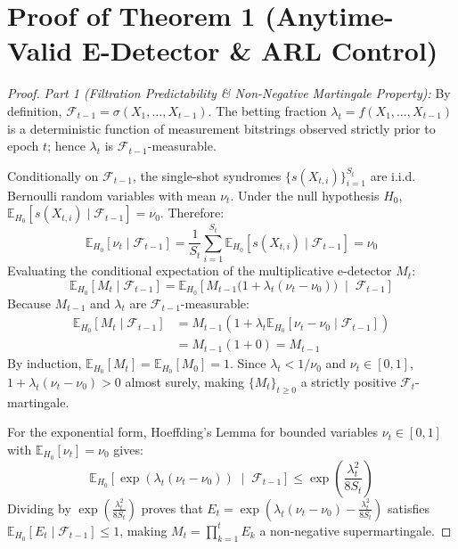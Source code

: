 \documentclass[aps,pra,twocolumn,superscriptaddress,10pt,floatfix]{revtex4-2}
\begin{document}
\section{Proof of Theorem 1 (Anytime-Valid E-Detector \& ARL Control)}
\label{app:proof_thm1}
\begin{proof}
\textit{Part 1 (Filtration Predictability \& Non-Negative Martingale Property):}
By definition, $\mathcal{F}_{t-1} = \sigma(X_1, \dots, X_{t-1})$. The betting fraction $\lambda_t = f(X_1, \dots, X_{t-1})$ is a deterministic function of measurement bitstrings observed strictly prior to epoch $t$; hence $\lambda_t$ is $\mathcal{F}_{t-1}$-measurable.

Conditionally on $\mathcal{F}_{t-1}$, the single-shot syndromes $\{s(X_{t, i})\}_{i=1}^{S_t}$ are i.i.d. Bernoulli random variables with mean $\nu_t$. Under the null hypothesis $H_0$, $\mathbb{E}_{H_0}[s(X_{t, i}) \mid \mathcal{F}_{t-1}] = \nu_0$. Therefore:
\begin{equation}
\mathbb{E}_{H_0}[\nu_t \mid \mathcal{F}_{t-1}] = \frac{1}{S_t} \sum_{i=1}^{S_t} \mathbb{E}_{H_0}[s(X_{t, i}) \mid \mathcal{F}_{t-1}] = \nu_0
\end{equation}
Evaluating the conditional expectation of the multiplicative e-detector $M_t$:
\begin{equation}
\mathbb{E}_{H_0}[M_t \mid \mathcal{F}_{t-1}] = \mathbb{E}_{H_0}\left[ M_{t-1} \big(1 + \lambda_t(\nu_t - \nu_0)\big) \;\middle|\; \mathcal{F}_{t-1} \right]
\end{equation}
Because $M_{t-1}$ and $\lambda_t$ are $\mathcal{F}_{t-1}$-measurable:
\begin{align}
\mathbb{E}_{H_0}[M_t \mid \mathcal{F}_{t-1}] &= M_{t-1} \left( 1 + \lambda_t \mathbb{E}_{H_0}[\nu_t - \nu_0 \mid \mathcal{F}_{t-1}] \right) \nonumber \\
&= M_{t-1} (1 + 0) = M_{t-1}
\end{align}
By induction, $\mathbb{E}_{H_0}[M_t] = \mathbb{E}_{H_0}[M_0] = 1$. Since $\lambda_t < 1/\nu_0$ and $\nu_t \in [0, 1]$, $1 + \lambda_t(\nu_t - \nu_0) > 0$ almost surely, making $\{M_t\}_{t \ge 0}$ a strictly positive $\mathcal{F}_t$-martingale.

For the exponential form, Hoeffding's Lemma for bounded variables $\nu_t \in [0, 1]$ with $\mathbb{E}_{H_0}[\nu_t] = \nu_0$ gives:
\begin{equation}
\mathbb{E}_{H_0}\left[ \exp\left( \lambda_t (\nu_t - \nu_0) \right) \;\middle|\; \mathcal{F}_{t-1} \right] \le \exp\left( \frac{\lambda_t^2}{8 S_t} \right)
\end{equation}
Dividing by $\exp(\frac{\lambda_t^2}{8 S_t})$ proves that $E_t = \exp(\lambda_t(\nu_t - \nu_0) - \frac{\lambda_t^2}{8 S_t})$ satisfies $\mathbb{E}_{H_0}[E_t \mid \mathcal{F}_{t-1}] \le 1$, making $M_t = \prod_{k=1}^t E_k$ a non-negative supermartingale.


\end{proof}
\end{document}
